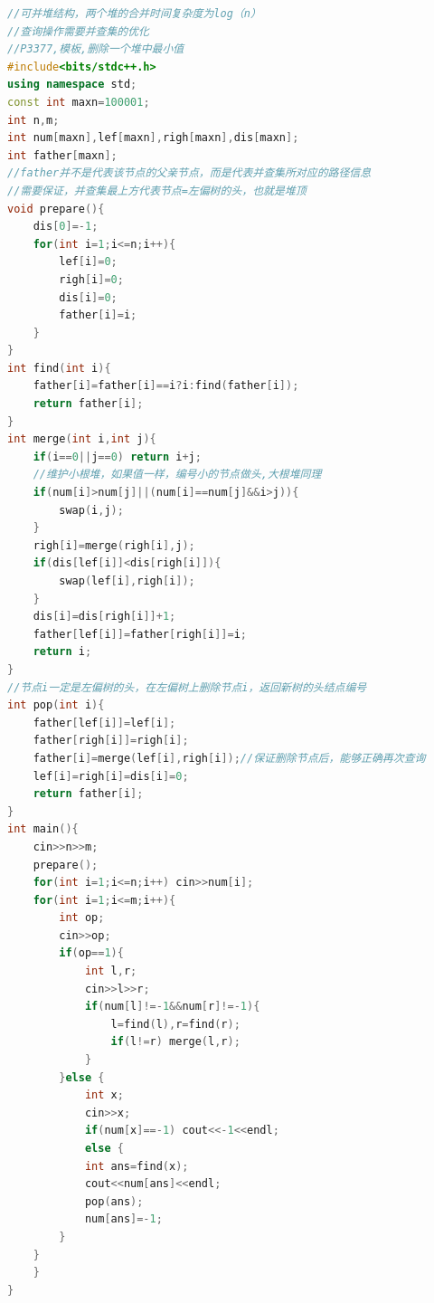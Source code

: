 \documentclass[a4paper,9pt]{extarticle}
\begin{document}
\begin{lstlisting}[language={C++}]
//可并堆结构，两个堆的合并时间复杂度为log（n）
//查询操作需要并查集的优化
//P3377,模板,删除一个堆中最小值
#include<bits/stdc++.h>
using namespace std;
const int maxn=100001;
int n,m;
int num[maxn],lef[maxn],righ[maxn],dis[maxn];
int father[maxn];
//father并不是代表该节点的父亲节点，而是代表并查集所对应的路径信息
//需要保证，并查集最上方代表节点=左偏树的头，也就是堆顶
void prepare(){
    dis[0]=-1;
    for(int i=1;i<=n;i++){
        lef[i]=0;
        righ[i]=0;
        dis[i]=0;
        father[i]=i;
    }
}
int find(int i){
    father[i]=father[i]==i?i:find(father[i]);
    return father[i];
}
int merge(int i,int j){
    if(i==0||j==0) return i+j;
    //维护小根堆，如果值一样，编号小的节点做头,大根堆同理
    if(num[i]>num[j]||(num[i]==num[j]&&i>j)){
        swap(i,j);
    }
    righ[i]=merge(righ[i],j);
    if(dis[lef[i]]<dis[righ[i]]){
        swap(lef[i],righ[i]);
    }
    dis[i]=dis[righ[i]]+1;
    father[lef[i]]=father[righ[i]]=i;
    return i;
}
//节点i一定是左偏树的头，在左偏树上删除节点i，返回新树的头结点编号
int pop(int i){
    father[lef[i]]=lef[i];
    father[righ[i]]=righ[i];
    father[i]=merge(lef[i],righ[i]);//保证删除节点后，能够正确再次查询
    lef[i]=righ[i]=dis[i]=0;
    return father[i];
}
int main(){
    cin>>n>>m;
    prepare();
    for(int i=1;i<=n;i++) cin>>num[i];
    for(int i=1;i<=m;i++){
        int op;
        cin>>op;
        if(op==1){
            int l,r;
            cin>>l>>r;
            if(num[l]!=-1&&num[r]!=-1){
                l=find(l),r=find(r);
                if(l!=r) merge(l,r);
            }
        }else {
            int x;
            cin>>x;
            if(num[x]==-1) cout<<-1<<endl;
            else {
            int ans=find(x);
            cout<<num[ans]<<endl;
            pop(ans);
            num[ans]=-1;
        }
    }
    }
}


\end{lstlisting}
\end{document}

